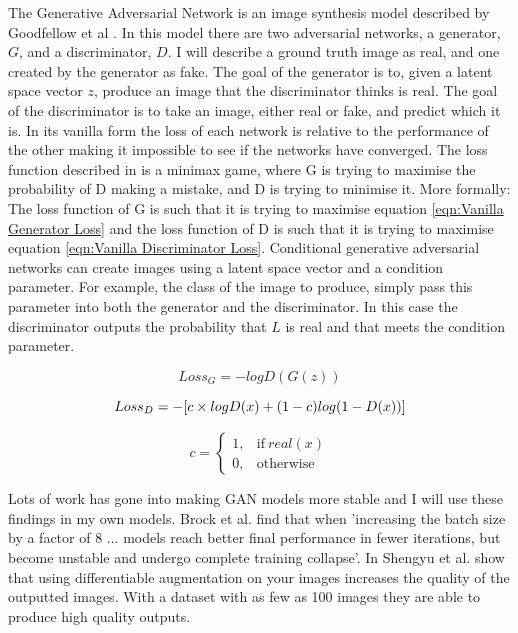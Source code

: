 \documentclass{UoYCSproject}
\begin{document}

The Generative Adversarial Network is an image synthesis model described by Goodfellow et al \cite{goodfellow2014generative}. In this model there are two adversarial networks, a generator, $ G $, and a discriminator, $ D $. I will describe a ground truth image as real, and one created by the generator as fake. The goal of the generator is to, given a latent space vector $ z $, produce an image that the discriminator thinks is real. The goal of the discriminator is to take an image, either real or fake, and predict which it is. In its vanilla form the loss of each network is relative to the performance of the other making it impossible to see if the networks have converged. The loss function described in \cite{goodfellow2014generative} is a minimax game, where G is trying to maximise the probability of D making a mistake, and D is trying to minimise it. More formally: The loss function of G is such that it is trying to maximise equation \ref{eqn:Vanilla Generator Loss} and the loss function of D is such that it is trying to maximise equation \ref{eqn:Vanilla Discriminator Loss}. Conditional generative adversarial networks can create images using a latent space vector and a condition parameter. For example, the class of the image to produce, simply pass this parameter into both the generator and the discriminator. In this case the discriminator outputs the probability that $ L $ is real and that meets the condition parameter.

\begin{equation}
    \label{eqn:Vanilla Generator Loss}
    Loss_G = -logD (G(z)) 
\end{equation}

\begin{equation}
    \label{eqn:Vanilla Discriminator Loss}
    Loss_D = -[c \times logD(x) + (1-c) log (1 - D(x))] \\
\end{equation}

\[ c =
\begin{cases}
  1, & \text{if}\ real(x) \\
  0, & \text{otherwise}
\end{cases} \]

Lots of work has gone into making GAN models more stable and I will use these findings in my own models. Brock et al. find that when 'increasing the batch size by a factor of 8 ... models reach better final performance in fewer iterations, but become unstable and undergo complete training collapse'\cite[3]{brock2019large}.
In \cite{zhao2020differentiable} Shengyu et al. show that using differentiable augmentation on your images increases the quality of the outputted images. With a dataset with as few as 100 images they are able to produce high quality outputs.
\end{document}
